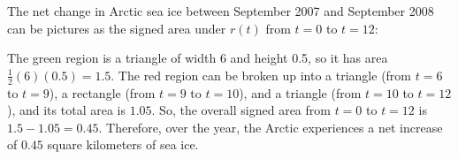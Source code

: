 \documentclass[main]{subfiles}
\begin{document}
\begin{enumerate}
  \begin{solution}
    The net change in Arctic sea ice between September 2007 and September
    2008 can be pictures as the signed area under $r(t)$ from $t = 0$ to
    $t = 12$:
    \begin{center}
    \end{center}
    The green region is a triangle of width 6 and height 0.5, so it has
    area $\frac{1}{2} (6)(0.5) = 1.5$.  The red region can be broken up
    into a triangle (from $t = 6$ to $t = 9$), a rectangle (from $t = 9$
    to $t = 10$), and a triangle (from $t = 10$ to $t = 12$), and its
    total area is $1.05$.  So, the overall signed area from $t = 0$ to $t
    = 12$ is $1.5 - 1.05 = 0.45$.  Therefore, over the year, the Arctic
    experiences a net increase of $0.45$ square kilometers of sea ice.
  \end{solution}

\pspace{\vfill}

\end{enumerate}
\end{document}
